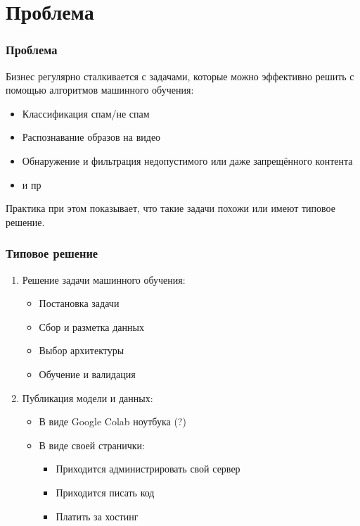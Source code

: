 \section{Проблема}

\begin{frame}
\frametitle{Проблема}
Бизнес регулярно сталкивается с задачами, которые можно эффективно решить с помощью алгоритмов машинного обучения:
\begin{itemize}
    \item Классификация спам/не спам
    \item Распознавание образов на видео
    \item Обнаружение и фильтрация недопустимого или даже запрещённого контента
    \item и пр
\end{itemize}

\bigskip
\pause

Практика при этом показывает, что \alert{такие задачи похожи или имеют типовое решение.}
\end{frame}

\begin{frame}
\frametitle{Типовое решение}
\begin{enumerate}
    \item<1-> Решение задачи машинного обучения:
    \begin{itemize}
        \item Постановка задачи
        \item Сбор и разметка данных
        \item Выбор архитектуры
        \item Обучение и валидация
    \end{itemize}
    \item<2-> Публикация модели и данных:
    \begin{itemize}
        \item В виде Google Colab ноутбука (?)
        \item В виде своей странички:
        \begin{itemize}
            \item Приходится администрировать свой сервер
            \item Приходится писать код
            \item Платить за хостинг
        \end{itemize}
    \end{itemize}
\end{enumerate}
\end{frame}

